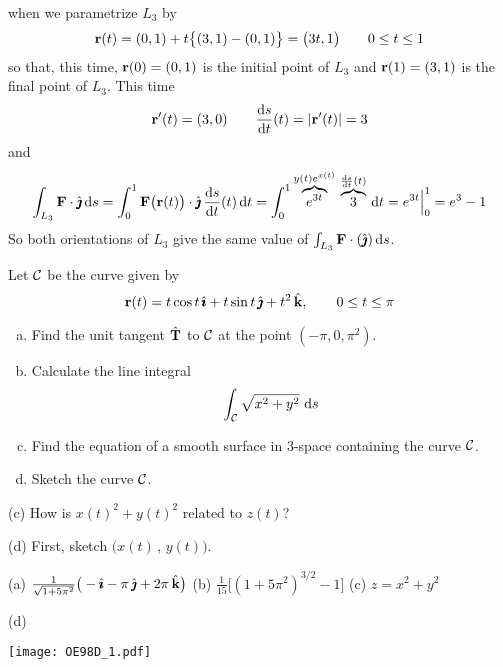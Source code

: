 \begin{solution}
when we parametrize $L_3$ by
\begin{equation*}
\mathbf{r}(t) = (0,1) + t\big\{(3,1)-(0,1)\big\}
       = \big(3t,1\big)\qquad
0\le t\le 1
\end{equation*}
so that, this time, $\mathbf{r}(0) = (0,1)$ is the initial point of $L_3$ and
$\mathbf{r}(1) = (3,1)$ is the final point of $L_3$. This time
\begin{equation*}
\vr'(t) = (3,0)\qquad
\diff{s}{t}(t) = |\vr'(t)| = 3
\end{equation*}
and
\begin{align*}
\int_{L_3} \vF\cdot \hj\,\dee{s}
=\int_0^1 \vF\big(\vr(t)\big)\cdot \hj\,\diff{s}{t}(t)\,\dee{t}
=\int_0^1\overbrace{e^{3t}}^{y(t)e^{x(t)}}\,
\overbrace{3}^{\diff{s}{t}(t)}\,\dee{t}
=e^{3t}\Big|_0^1
=e^3-1
\end{align*}
So both orientations of $L_3$ give the same value of $\int_{L_3} \mathbf{F}\cdot(\hat{\pmb{\jmath}})\,\mathrm{d}s$.
\end{solution}


\begin{question}[M317 1998D] %
	Let $\mathcal{C}$ be the curve given by 
	$$
	\mathbf{r}(t)=t\cos t\,\hat{\pmb{\imath}}+t\sin t\,\hat{\pmb{\jmath}}+t^2\,\hat{\mathbf{k}},\qquad 0\le t\le \pi
	$$
	\begin{enumerate}[(a)]
		\item
		Find the unit tangent $\hat{\mathbf{T}}$ to $\mathcal{C}$ at the point $(-\pi,0,\pi^2)$.
		\item
		Calculate the line integral
		$$
		\int_{\mathcal{C}} \sqrt{x^2+y^2}\ \mathrm{d}s
		$$
		\item
		Find the equation of a smooth surface in $3$-space containing
		the curve $\mathcal{C}$.
		\item
		Sketch the curve $\mathcal{C}$.
	\end{enumerate}
\end{question}

\begin{hint} 
	(c) How is $x(t)^2+y(t)^2$ related to $z(t)$?
	
	(d) First, sketch $\big(x(t)\,,\,y(t)\big)$.
	
\end{hint}

\begin{answer} 
	(a) $\frac{1}{\sqrt{1+5\pi^2}}\big(-\hat{\pmb{\imath}}-\pi\,\hat{\pmb{\jmath}}+2\pi\,\hat{\mathbf{k}}\big)$\qquad
	(b) $\frac{1}{15}\big[(1+5\pi^2)^{3/2}-1\big]$\qquad
	(c) $z=x^2+y^2$
	
	(d) 
	\begin{center}
		\texttt{[image: OE98D\_1.pdf]}
	\end{center}
	
\end{answer}

